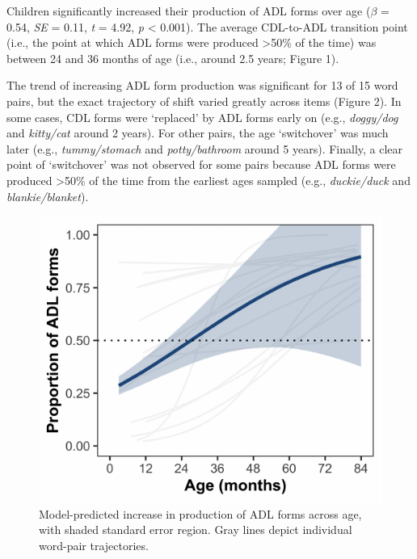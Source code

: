 \documentclass[10pt, letterpaper]{article}
\newenvironment{CodeChunk}{}{}
\begin{document}
Children significantly increased their production of ADL forms over age
(\(\beta\) = 0.54, \emph{SE} = 0.11, \emph{t} = 4.92, \emph{p}
\textless{} 0.001). The average CDL-to-ADL transition point (i.e., the
point at which ADL forms were produced \textgreater50\% of the time) was
between 24 and 36 months of age (i.e., around 2.5 years; Figure 1).

The trend of increasing ADL form production was significant for 13 of 15
word pairs, but the exact trajectory of shift varied greatly across
items (Figure 2). In some cases, CDL forms were `replaced' by ADL forms
early on (e.g., \emph{doggy/dog} and \emph{kitty/cat} around 2 years).
For other pairs, the age `switchover' was much later (e.g.,
\emph{tummy/stomach} and \emph{potty/bathroom} around 5 years). Finally,
a clear point of `switchover' was not observed for some pairs because
ADL forms were produced \textgreater50\% of the time from the earliest
ages sampled (e.g., \emph{duckie/duck} and \emph{blankie/blanket}).

\begin{CodeChunk}
\begin{figure}[h]

\includegraphics{figs/shift-timing-fig-1} \hfill{}

\caption[Model-predicted increase in production of ADL forms across age, with shaded standard error region]{Model-predicted increase in production of ADL forms across age, with shaded standard error region. Gray lines depict individual word-pair trajectories.}\label{fig:shift-timing-fig}
\end{figure}
\end{CodeChunk}
\end{document}
